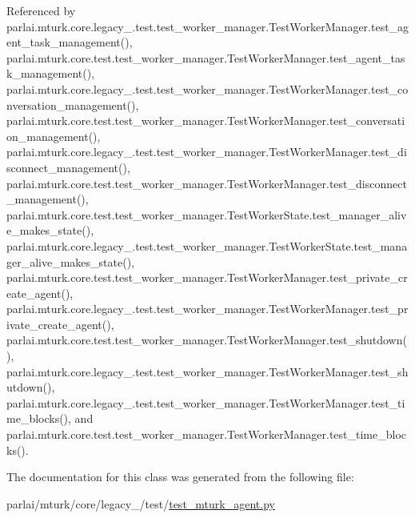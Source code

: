 Referenced by parlai.\+mturk.\+core.\+legacy\+\_.\+test.\+test\+\_\+worker\+\_\+manager.\+Test\+Worker\+Manager.\+test\+\_\+agent\+\_\+task\+\_\+management(), parlai.\+mturk.\+core.\+test.\+test\+\_\+worker\+\_\+manager.\+Test\+Worker\+Manager.\+test\+\_\+agent\+\_\+task\+\_\+management(), parlai.\+mturk.\+core.\+legacy\+\_.\+test.\+test\+\_\+worker\+\_\+manager.\+Test\+Worker\+Manager.\+test\+\_\+conversation\+\_\+management(), parlai.\+mturk.\+core.\+test.\+test\+\_\+worker\+\_\+manager.\+Test\+Worker\+Manager.\+test\+\_\+conversation\+\_\+management(), parlai.\+mturk.\+core.\+legacy\+\_.\+test.\+test\+\_\+worker\+\_\+manager.\+Test\+Worker\+Manager.\+test\+\_\+disconnect\+\_\+management(), parlai.\+mturk.\+core.\+test.\+test\+\_\+worker\+\_\+manager.\+Test\+Worker\+Manager.\+test\+\_\+disconnect\+\_\+management(), parlai.\+mturk.\+core.\+test.\+test\+\_\+worker\+\_\+manager.\+Test\+Worker\+State.\+test\+\_\+manager\+\_\+alive\+\_\+makes\+\_\+state(), parlai.\+mturk.\+core.\+legacy\+\_.\+test.\+test\+\_\+worker\+\_\+manager.\+Test\+Worker\+State.\+test\+\_\+manager\+\_\+alive\+\_\+makes\+\_\+state(), parlai.\+mturk.\+core.\+test.\+test\+\_\+worker\+\_\+manager.\+Test\+Worker\+Manager.\+test\+\_\+private\+\_\+create\+\_\+agent(), parlai.\+mturk.\+core.\+legacy\+\_.\+test.\+test\+\_\+worker\+\_\+manager.\+Test\+Worker\+Manager.\+test\+\_\+private\+\_\+create\+\_\+agent(), parlai.\+mturk.\+core.\+test.\+test\+\_\+worker\+\_\+manager.\+Test\+Worker\+Manager.\+test\+\_\+shutdown(), parlai.\+mturk.\+core.\+legacy\+\_.\+test.\+test\+\_\+worker\+\_\+manager.\+Test\+Worker\+Manager.\+test\+\_\+shutdown(), parlai.\+mturk.\+core.\+legacy\+\_.\+test.\+test\+\_\+worker\+\_\+manager.\+Test\+Worker\+Manager.\+test\+\_\+time\+\_\+blocks(), and parlai.\+mturk.\+core.\+test.\+test\+\_\+worker\+\_\+manager.\+Test\+Worker\+Manager.\+test\+\_\+time\+\_\+blocks().



The documentation for this class was generated from the following file\+:\begin{DoxyCompactItemize}
\item 
parlai/mturk/core/legacy\+\_/test/\hyperlink{legacy__2018_2test_2test__mturk__agent_8py}{test\+\_\+mturk\+\_\+agent.\+py}\end{DoxyCompactItemize}
